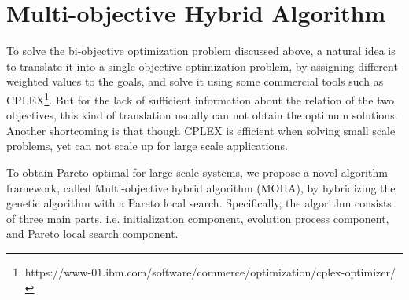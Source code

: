 \section{Multi-objective Hybrid Algorithm \label{se:loc}}
To solve the bi-objective optimization problem discussed above, a natural idea is to translate it into a single objective optimization problem, by assigning different weighted values to the goals, and solve it using some commercial tools such as CPLEX\footnote{https://www-01.ibm.com/software/commerce/optimization/cplex-optimizer/}. But for the lack of sufficient information about the relation of the two objectives, this kind of translation usually can not obtain the optimum solutions. Another shortcoming is that though CPLEX is efficient when solving small scale problems, yet can not scale up for large scale applications.

To obtain Pareto optimal for large scale systems, we propose a novel algorithm framework, called Multi-objective hybrid algorithm (MOHA), by hybridizing the genetic algorithm with a Pareto local search. Specifically, the algorithm consists of three main parts, i.e. initialization component, evolution process component, and Pareto local search component.


